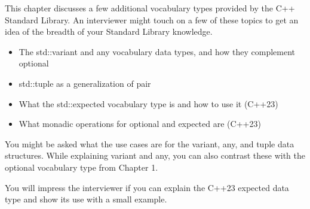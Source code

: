 
This chapter discusses a few additional vocabulary types provided by the C++ Standard Library. An interviewer might touch on a few of these topics to get an idea of the breadth of your Standard Library knowledge.


\begin{itemize}
\item
The std::variant and any vocabulary data types, and how they complement optional

\item
std::tuple as a generalization of pair

\item
What the std::expected vocabulary type is and how to use it (C++23)

\item
What monadic operations for optional and expected are (C++23)
\end{itemize}


You might be asked what the use cases are for the variant, any, and tuple data structures. While explaining variant and any, you can also contrast these with the optional vocabulary type from Chapter 1.

You will impress the interviewer if you can explain the C++23 expected data type and show its use with a small example.
